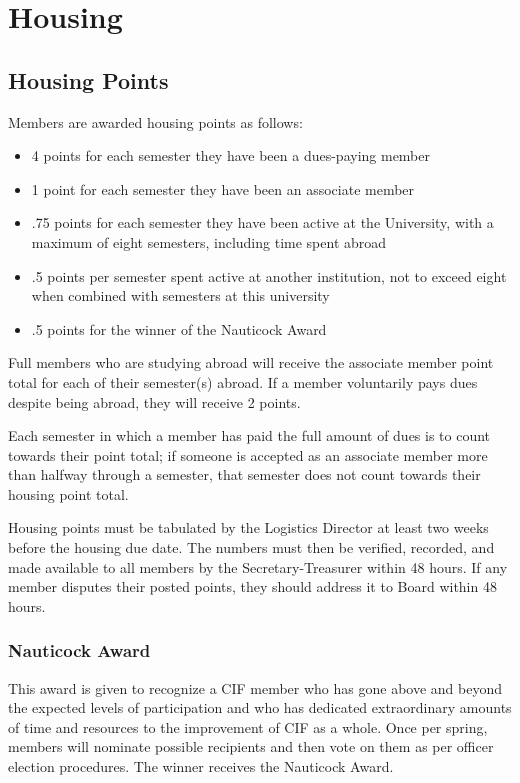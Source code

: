 \section {Housing}
\label{sec:housing}



	\subsection {Housing Points}

Members are awarded housing points as follows:
\begin{itemize}
	\item 4 points for each semester they have been a dues-paying member
	\item 1 point for each semester they have been an associate member
	\item .75 points for each semester they have been active at the University, with a maximum of eight semesters, including time spent abroad
	\item .5 points per semester spent active at another institution, not to exceed eight when combined with semesters at this university
	\item .5 points for the winner of the Nauticock Award
\end{itemize}

Full members who are studying abroad will receive the associate member point total for each of their semester(s) abroad. If a member voluntarily pays dues despite being abroad, they will receive 2 points.

Each semester in which a member has paid the full amount of dues is to count towards their point total; if someone is accepted as an associate member more than halfway through a semester, that semester does not count towards their housing point total.

Housing points must be tabulated by the Logistics Director at least two weeks before the housing due date. The numbers must then be verified, recorded, and made available to all members by the Secretary-Treasurer within 48 hours. If any member disputes their posted points, they should address it to Board within 48 hours.



		\subsubsection {Nauticock Award}

	This award is given to recognize a CIF member who has gone above and beyond the expected levels of participation and who has dedicated extraordinary amounts of time and resources to the improvement of CIF as a whole. Once per spring, members will nominate possible recipients and then vote on them as per officer election procedures. The winner receives the Nauticock Award.



